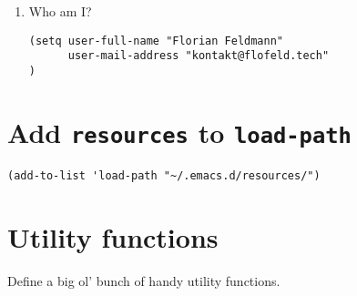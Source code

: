 \documentclass{article}
\begin{document}
\begin{enumerate}
\item Who am I?
\label{sec:org10f41af}

\begin{verbatim}
(setq user-full-name "Florian Feldmann"
	  user-mail-address "kontakt@flofeld.tech"
)
\end{verbatim}
\end{enumerate}

\section{Add \texttt{resources} to \texttt{load-path}}
\label{sec:orgb86ca34}

\begin{verbatim}
(add-to-list 'load-path "~/.emacs.d/resources/")
\end{verbatim}


\section{Utility functions}
\label{sec:orgaed19cd}

Define a big ol' bunch of handy utility functions.
\end{document}
